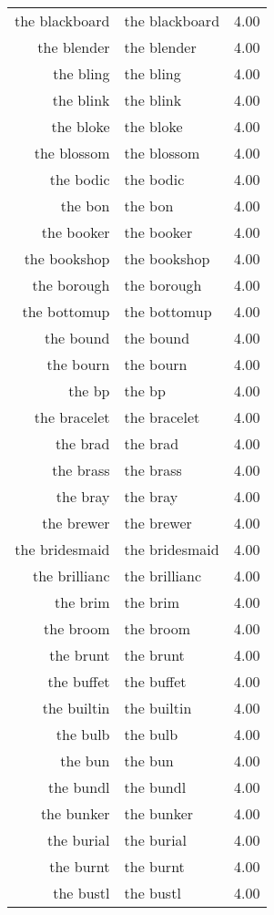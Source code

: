 \begin{table}[ht]
\begin{tabular}{rlr}
  the blackboard & the blackboard & 4.00 \\ 
  the blender & the blender & 4.00 \\ 
  the bling & the bling & 4.00 \\ 
  the blink & the blink & 4.00 \\ 
  the bloke & the bloke & 4.00 \\ 
  the blossom & the blossom & 4.00 \\ 
  the bodic & the bodic & 4.00 \\ 
  the bon & the bon & 4.00 \\ 
  the booker & the booker & 4.00 \\ 
  the bookshop & the bookshop & 4.00 \\ 
  the borough & the borough & 4.00 \\ 
  the bottomup & the bottomup & 4.00 \\ 
  the bound & the bound & 4.00 \\ 
  the bourn & the bourn & 4.00 \\ 
  the bp & the bp & 4.00 \\ 
  the bracelet & the bracelet & 4.00 \\ 
  the brad & the brad & 4.00 \\ 
  the brass & the brass & 4.00 \\ 
  the bray & the bray & 4.00 \\ 
  the brewer & the brewer & 4.00 \\ 
  the bridesmaid & the bridesmaid & 4.00 \\ 
  the brillianc & the brillianc & 4.00 \\ 
  the brim & the brim & 4.00 \\ 
  the broom & the broom & 4.00 \\ 
  the brunt & the brunt & 4.00 \\ 
  the buffet & the buffet & 4.00 \\ 
  the builtin & the builtin & 4.00 \\ 
  the bulb & the bulb & 4.00 \\ 
  the bun & the bun & 4.00 \\ 
  the bundl & the bundl & 4.00 \\ 
  the bunker & the bunker & 4.00 \\ 
  the burial & the burial & 4.00 \\ 
  the burnt & the burnt & 4.00 \\ 
  the bustl & the bustl & 4.00 \\ 

\end{tabular}
\end{table}
